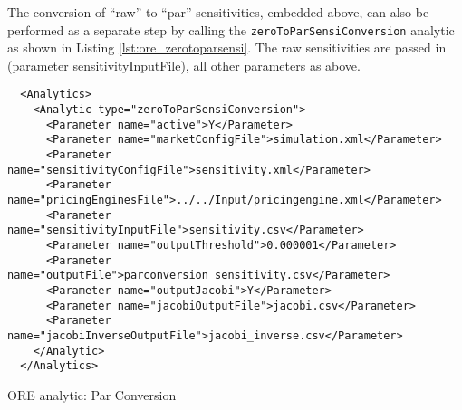{The conversion of ``raw'' to ``par'' sensitivities, embedded above, can also be performed as a
separate step by calling the {\tt zeroToParSensiConversion} analytic as shown in Listing
\ref{lst:ore_zerotoparsensi}. The raw sensitivities are passed in (parameter sensitivityInputFile),
all other parameters as above.

\begin{listing}[H]
\begin{verbatim}
  <Analytics>
    <Analytic type="zeroToParSensiConversion">
      <Parameter name="active">Y</Parameter>
      <Parameter name="marketConfigFile">simulation.xml</Parameter>
      <Parameter name="sensitivityConfigFile">sensitivity.xml</Parameter>
      <Parameter name="pricingEnginesFile">../../Input/pricingengine.xml</Parameter>
      <Parameter name="sensitivityInputFile">sensitivity.csv</Parameter>
      <Parameter name="outputThreshold">0.000001</Parameter>
      <Parameter name="outputFile">parconversion_sensitivity.csv</Parameter>
      <Parameter name="outputJacobi">Y</Parameter>
      <Parameter name="jacobiOutputFile">jacobi.csv</Parameter>
      <Parameter name="jacobiInverseOutputFile">jacobi_inverse.csv</Parameter>
    </Analytic>
  </Analytics>
\end{verbatim}
\caption{ORE analytic: Par Conversion}
\label{lst:ore_zerotoparsensi}
\end{listing}

}
